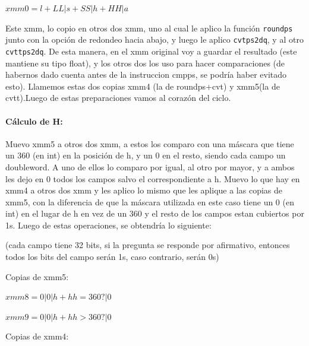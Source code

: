 \documentclass[a4paper]{article}
\begin{document}
$xmm0=l+LL|s+SS|h+HH|a$

\vspace*{0.3cm}

Este xmm, lo copio en otros dos xmm, uno al cual le aplico la función {\tt roundps} junto con la opción de redondeo hacia abajo, y luego le aplico {\tt cvtps2dq}, y al otro {\tt cvttps2dq}. De esta manera, en el xmm original voy a guardar el resultado (este mantiene su tipo float), y los otros dos los uso para hacer comparaciones (de habernos dado cuenta antes de la instruccion cmpps, se podría haber evitado esto). Llamemos estas dos copias xmm4 (la de roundps+cvt) y xmm5(la de cvtt).Luego de estas preparaciones vamos al corazón del ciclo.

\paragraph*{Cálculo de H:}

Muevo xmm5 a otros dos xmm, a estos los comparo con una máscara que tiene un 360 (en int) en la posición de h, y un 0 en el resto, siendo cada campo un doubleword. A uno de ellos lo comparo por igual, al otro por mayor, y a ambos les dejo en 0 todos los campos salvo el correspondiente a h. Muevo lo que hay en xmm4 a otros dos xmm y les aplico lo mismo que les aplique a las copias de xmm5, con la diferencia de que la máscara utilizada en este caso tiene un 0 (en int) en el lugar de h en vez de un 360 y el resto de los campos estan cubiertos por 1s. Luego de estas operaciones, se obtendría lo siguiente:

\vspace*{0.3cm}

(cada campo tiene 32 bits, si la pregunta se responde por afirmativo, entonces todos los bits del campo serán 1s, caso contrario, serán 0s)

\vspace*{0.3cm}

Copias de xmm5:

\vspace*{0.3cm}

$xmm8= 0 | 0 | h+hh = 360? | 0$

\vspace*{0.3cm} 

$xmm9=0 | 0 | h+hh > 360? | 0$

\vspace*{0.3cm}

Copias de xmm4:

\vspace*{0.3cm}
\end{document}
